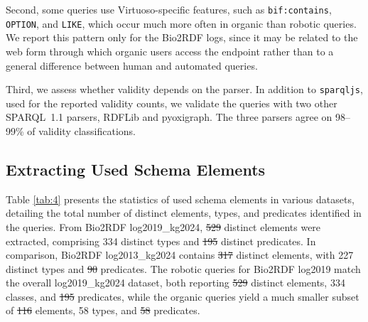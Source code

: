 \documentclass[sw]{iosart2x}
\providecommand{\DIFadd}[1]{{\protect\color{blue}\uwave{#1}}} %
\providecommand{\DIFdel}[1]{{\protect\color{red}\sout{#1}}} %
\providecommand{\DIFaddbegin}{} %
\providecommand{\DIFaddend}{} %
\providecommand{\DIFdelbegin}{} %
\providecommand{\DIFdelend}{} %
\providecommand{\DIFscaledelfig}{0.5}
\newlength{\DIFdelgraphicswidth} %
\newlength{\DIFdelgraphicsheight} %
\providecommand{\DIFaddincludegraphics}[2][]{{\color{blue}\fbox{\DIFOincludegraphics[#1]{#2}}}} %
\providecommand{\DIFdelincludegraphics}[2][]{%
\sbox{\DIFdelgraphicsbox}{\DIFOincludegraphics[#1]{#2}}%
\settoboxwidth{\DIFdelgraphicswidth}{\DIFdelgraphicsbox} %
\settoboxtotalheight{\DIFdelgraphicsheight}{\DIFdelgraphicsbox} %
\scalebox{\DIFscaledelfig}{%
\parbox[b]{\DIFdelgraphicswidth}{\usebox{\DIFdelgraphicsbox}\\[-\baselineskip] \rule{\DIFdelgraphicswidth}{0em}}\llap{\resizebox{\DIFdelgraphicswidth}{\DIFdelgraphicsheight}{%
\setlength{\unitlength}{\DIFdelgraphicswidth}%
\begin{picture}(1,1)%
\thicklines\linethickness{2pt} %
{\color[rgb]{1,0,0}\put(0,0){\framebox(1,1){}}}%
{\color[rgb]{1,0,0}\put(0,0){\line( 1,1){1}}}%
{\color[rgb]{1,0,0}\put(0,1){\line(1,-1){1}}}%
\end{picture}%
}\hspace*{3pt}}} %
} %
\DeclareRobustCommand{\DIFaddbegin}{\DIFOaddbegin \let\includegraphics\DIFaddincludegraphics} %
\DeclareRobustCommand{\DIFaddend}{\DIFOaddend \let\includegraphics\DIFOincludegraphics} %
\DeclareRobustCommand{\DIFdelbegin}{\DIFOdelbegin \let\includegraphics\DIFdelincludegraphics} %
\DeclareRobustCommand{\DIFdelend}{\DIFOaddend \let\includegraphics\DIFOincludegraphics} %
\begin{document}
Second, some queries use Virtuoso-specific features, such as \texttt{bif:contains}, \texttt{OPTION}, and \texttt{LIKE}, which occur much more often in organic than robotic queries. We report this pattern only for the Bio2RDF logs, since it may be related to the web form through which organic users access the endpoint rather than to a general difference between human and automated queries.

Third, we assess whether validity depends on the parser. In addition to \texttt{sparqljs}, used for the reported validity counts, we validate the queries with two other SPARQL~1.1 parsers, RDFLib and pyoxigraph. The three parsers agree on 98--99\% of validity classifications.

\subsection{Extracting Used Schema Elements} 
Table \ref{tab:4} presents the statistics of used schema elements in various datasets, detailing the total number of distinct elements, types, and predicates identified in the queries. From Bio2RDF log2019\_kg2024, \DIFdelbegin \DIFdel{529 }\DIFdelend \DIFaddbegin \DIFadd{525 }\DIFaddend distinct elements were extracted, comprising 334 distinct types and \DIFdelbegin \DIFdel{195 }\DIFdelend \DIFaddbegin \DIFadd{191 }\DIFaddend distinct predicates. In comparison, Bio2RDF log2013\_kg2024 contains \DIFdelbegin \DIFdel{317 }\DIFdelend \DIFaddbegin \DIFadd{313 }\DIFaddend distinct elements, with 227 distinct types and \DIFdelbegin \DIFdel{90 }\DIFdelend \DIFaddbegin \DIFadd{86 }\DIFaddend predicates. The robotic queries for Bio2RDF log2019 match the overall log2019\_kg2024 dataset, both reporting \DIFdelbegin \DIFdel{529 }\DIFdelend \DIFaddbegin \DIFadd{525 }\DIFaddend distinct elements, 334 classes, and \DIFdelbegin \DIFdel{195 }\DIFdelend \DIFaddbegin \DIFadd{191 }\DIFaddend predicates, while the organic queries yield a much smaller subset of \DIFdelbegin \DIFdel{116 }\DIFdelend \DIFaddbegin \DIFadd{113 }\DIFaddend elements, 58 types, and \DIFdelbegin \DIFdel{58 }\DIFdelend \DIFaddbegin \DIFadd{55 }\DIFaddend predicates.
\end{document}
